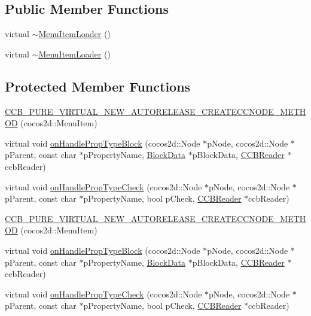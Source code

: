 \subsection*{Public Member Functions}
\begin{DoxyCompactItemize}
\item 
virtual \hyperlink{classcocosbuilder_1_1MenuItemLoader_af194202f38bba4252043f8688ebfd442}{$\sim$\+Menu\+Item\+Loader} ()
\item 
virtual \hyperlink{classcocosbuilder_1_1MenuItemLoader_af194202f38bba4252043f8688ebfd442}{$\sim$\+Menu\+Item\+Loader} ()
\end{DoxyCompactItemize}
\subsection*{Protected Member Functions}
\begin{DoxyCompactItemize}
\item 
\hyperlink{classcocosbuilder_1_1MenuItemLoader_a71f199ca59eb6401e82f1fa3c53b59fc}{C\+C\+B\+\_\+\+P\+U\+R\+E\+\_\+\+V\+I\+R\+T\+U\+A\+L\+\_\+\+N\+E\+W\+\_\+\+A\+U\+T\+O\+R\+E\+L\+E\+A\+S\+E\+\_\+\+C\+R\+E\+A\+T\+E\+C\+C\+N\+O\+D\+E\+\_\+\+M\+E\+T\+H\+OD} (cocos2d\+::\+Menu\+Item)
\item 
virtual void \hyperlink{classcocosbuilder_1_1MenuItemLoader_ad65759938217df7461994000378b82ba}{on\+Handle\+Prop\+Type\+Block} (cocos2d\+::\+Node $\ast$p\+Node, cocos2d\+::\+Node $\ast$p\+Parent, const char $\ast$p\+Property\+Name, \hyperlink{structcocosbuilder_1_1BlockData}{Block\+Data} $\ast$p\+Block\+Data, \hyperlink{classcocosbuilder_1_1CCBReader}{C\+C\+B\+Reader} $\ast$ccb\+Reader)
\item 
virtual void \hyperlink{classcocosbuilder_1_1MenuItemLoader_a57476b45bdc0414f230a116680684e13}{on\+Handle\+Prop\+Type\+Check} (cocos2d\+::\+Node $\ast$p\+Node, cocos2d\+::\+Node $\ast$p\+Parent, const char $\ast$p\+Property\+Name, bool p\+Check, \hyperlink{classcocosbuilder_1_1CCBReader}{C\+C\+B\+Reader} $\ast$ccb\+Reader)
\item 
\hyperlink{classcocosbuilder_1_1MenuItemLoader_a71f199ca59eb6401e82f1fa3c53b59fc}{C\+C\+B\+\_\+\+P\+U\+R\+E\+\_\+\+V\+I\+R\+T\+U\+A\+L\+\_\+\+N\+E\+W\+\_\+\+A\+U\+T\+O\+R\+E\+L\+E\+A\+S\+E\+\_\+\+C\+R\+E\+A\+T\+E\+C\+C\+N\+O\+D\+E\+\_\+\+M\+E\+T\+H\+OD} (cocos2d\+::\+Menu\+Item)
\item 
virtual void \hyperlink{classcocosbuilder_1_1MenuItemLoader_aeed0d2d9c8a1212a9f8b9583e155aa92}{on\+Handle\+Prop\+Type\+Block} (cocos2d\+::\+Node $\ast$p\+Node, cocos2d\+::\+Node $\ast$p\+Parent, const char $\ast$p\+Property\+Name, \hyperlink{structcocosbuilder_1_1BlockData}{Block\+Data} $\ast$p\+Block\+Data, \hyperlink{classcocosbuilder_1_1CCBReader}{C\+C\+B\+Reader} $\ast$ccb\+Reader)
\item 
virtual void \hyperlink{classcocosbuilder_1_1MenuItemLoader_af19804cbfaa8df27b3813106a23d527c}{on\+Handle\+Prop\+Type\+Check} (cocos2d\+::\+Node $\ast$p\+Node, cocos2d\+::\+Node $\ast$p\+Parent, const char $\ast$p\+Property\+Name, bool p\+Check, \hyperlink{classcocosbuilder_1_1CCBReader}{C\+C\+B\+Reader} $\ast$ccb\+Reader)
\end{DoxyCompactItemize}
